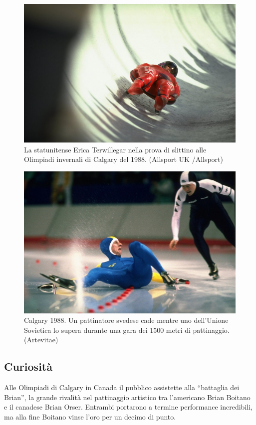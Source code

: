 \documentclass[
]{book}
\begin{document}
\begin{figure}
\includegraphics[width=0.8\linewidth]{images/IlPost/1988} \caption{La statunitense Erica Terwillegar nella prova di slittino alle Olimpiadi invernali di Calgary del 1988. (Allsport UK /Allsport)}\label{fig:unnamed-chunk-48}
\end{figure}

\begin{figure}
\includegraphics[width=0.8\linewidth]{images/ArteVitae/1988} \caption{Calgary 1988. Un pattinatore svedese cade mentre uno dell’Unione Sovietica lo supera durante una gara dei 1500 metri di pattinaggio. (Artevitae)}\label{fig:unnamed-chunk-49}
\end{figure}

\subsection*{Curiosità}\label{curiosituxe0-4}

Alle Olimpiadi di Calgary in Canada il pubblico assistette alla ``battaglia dei Brian'', la grande rivalità nel pattinaggio artistico tra l'americano Brian Boitano e il canadese Brian Orser. Entrambi portarono a termine performance incredibili, ma alla fine Boitano vinse l'oro per un decimo di punto.
\end{document}
